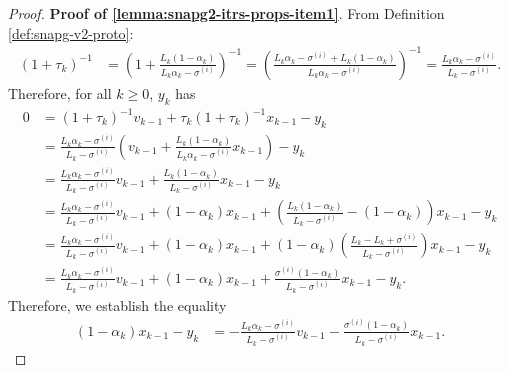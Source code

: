 \documentclass[12pt]{article}
\begin{document}
    \begin{proof}
        \textbf{Proof of \ref{lemma:snapg2-itrs-props-item1}}. 
        From Definition \ref{def:snapg-v2-proto}:
        \begin{align*}
            (1 + \tau_k)^{-1}
            &=
            \left(
                1 + \frac{L_k(1 - \alpha_k)}{L_k\alpha_k - \sigma^{(i)}}
            \right)^{-1} = \left(
                \frac{L_k\alpha_k - \sigma^{(i)} + L_k(1 - \alpha_k)}{L_k\alpha_k - \sigma^{(i)}}
            \right)^{-1}
            = \frac{L_k\alpha_k - \sigma^{(i)}}{L_k - \sigma^{(i)}}. 
        \end{align*}
        Therefore, for all $k \ge 0$, $y_k$ has 
        \begin{align*}
            0 &= (1 + \tau_k)^{-1} v_{k - 1} + \tau_k (1 + \tau_k)^{-1} x_{k - 1} - y_k
            \\
            &= \frac{L_k\alpha_k - \sigma^{(i)}}{L_k - \sigma^{(i)}} 
            \left(
                v_{k - 1} + \frac{L_k(1 - \alpha_k)}{L_k\alpha_k - \sigma^{(i)}} x_{k - 1}
            \right) - y_k
            \\
            &= \frac{L_k\alpha_k - \sigma^{(i)}}{L_k - \sigma^{(i)}} v_{k - 1}
            + \frac{L_k(1 - \alpha_k)}{L_k - \sigma^{(i)}} x_{k - 1} - y_k
            \\
            &= \frac{L_k\alpha_k - \sigma^{(i)}}{L_k - \sigma^{(i)}} v_{k - 1} + (1 - \alpha_k)x_{k - 1}
            + 
            \left(
                \frac{L_k(1 - \alpha_k)}{L_k - \sigma^{(i)}} - (1 - \alpha_k)
            \right) x_{k - 1} - y_k
            \\
            &= \frac{L_k\alpha_k - \sigma^{(i)}}{L_k - \sigma^{(i)}} v_{k - 1} + (1 - \alpha_k)x_{k - 1}
            + 
            (1 - \alpha_k)\left(
                \frac{L_k - L_k + \sigma^{(i)}}{L_k - \sigma^{(i)}}
            \right) x_{k - 1} - y_k
            \\
            &= \frac{L_k\alpha_k - \sigma^{(i)}}{L_k - \sigma^{(i)}} v_{k - 1} + (1 - \alpha_k)x_{k - 1}
            + 
            \frac{\sigma^{(i)}(1 - \alpha_k)}{L_k - \sigma^{(i)}}x_{k - 1} - y_k. 
        \end{align*}
        Therefore, we establish the equality 
        \begin{align*}
            (1 - \alpha_k)x_{k - 1} - y_k &= 
            - \frac{L_k\alpha_k - \sigma^{(i)}}{L_k - \sigma^{(i)}} v_{k - 1} 
            - \frac{\sigma^{(i)}(1 - \alpha_k)}{L_k - \sigma^{(i)}} x_{k - 1}. 
        \end{align*}

\end{proof}
\end{document}
